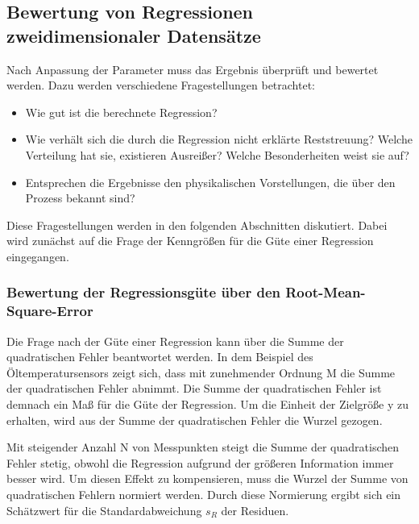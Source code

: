 \clearpage

\subsection{Bewertung von Regressionen zweidimensionaler Datens\"{a}tze}

\noindent Nach Anpassung der Parameter muss das Ergebnis \"{u}berpr\"{u}ft und bewertet werden. Dazu werden verschiedene Fragestellungen betrachtet:

\begin{itemize}
    \item Wie gut ist die berechnete Regression?
    \item  Wie verh\"{a}lt sich die durch die Regression nicht erkl\"{a}rte Reststreuung? Welche Verteilung hat sie, existieren Ausrei{\ss}er? Welche Besonderheiten weist sie auf?
    \item  Entsprechen die Ergebnisse den physikalischen Vorstellungen, die \"{u}ber den Prozess bekannt sind?
\end{itemize}

\noindent Diese Fragestellungen werden in den folgenden Abschnitten diskutiert. Dabei wird zun\"{a}chst auf die Frage der Kenngr\"{o}{\ss}en f\"{u}r die G\"{u}te einer Regression eingegangen.

\subsubsection{Bewertung der Regressionsg\"{u}te \"{u}ber den Root-Mean-Square-Error}

\noindent Die Frage nach der G\"{u}te einer Regression kann \"{u}ber die Summe der quadratischen Fehler beantwortet werden. In dem Beispiel des \"{O}ltemperatursensors zeigt sich, dass mit zunehmender Ordnung M die Summe der quadratischen Fehler abnimmt. Die Summe der quadratischen Fehler ist demnach ein Ma{\ss} f\"{u}r die G\"{u}te der Regression. Um die Einheit der Zielgr\"{o}{\ss}e y zu erhalten, wird aus der Summe der quadratischen Fehler die Wurzel gezogen.\newline

\noindent Mit steigender Anzahl N von Messpunkten steigt die Summe der quadratischen Fehler stetig, obwohl die Regression aufgrund der gr\"{o}{\ss}eren Information immer besser wird. Um diesen Effekt zu kompensieren, muss die Wurzel der Summe von quadratischen Fehlern normiert werden. Durch diese Normierung ergibt sich ein Sch\"{a}tzwert f\"{u}r die Standardabweichung $s_{R}$ der Residuen.\newline

